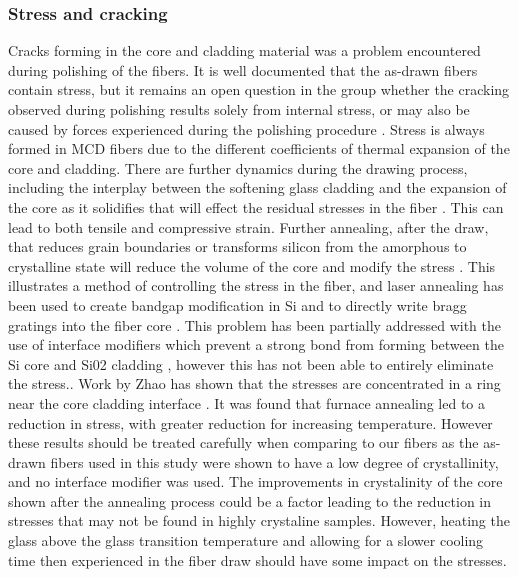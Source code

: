 \subsubsection{Stress and cracking}

Cracks forming in the core and cladding material was a problem encountered during polishing of the fibers. It is well documented that the as-drawn fibers contain stress, but it remains an open question in the group whether the cracking observed during polishing results solely from internal stress, or may also be caused by forces experienced during the polishing procedure \cite{Healy2018AFibres, Fokine2017LaserFibers, LapointeElectricalFibres, KristinKristin_thesis_final}. 
Stress is always formed in MCD fibers due to the different coefficients of thermal expansion of the core and cladding. There are further dynamics during the drawing process, including the interplay between the softening glass cladding and the expansion of the core as it solidifies that will effect the residual stresses in the fiber \cite{Healy2018AFibres}. This can lead to both tensile and compressive strain. Further annealing, after the draw, that reduces grain boundaries or transforms silicon from the amorphous to crystalline state will reduce the volume of the core and modify the stress \cite{Zhao2017EffectFibre}. This illustrates a method of controlling the stress in the fiber, and laser annealing has been used to create bandgap modification in Si \cite{Healy2014ExtremeFibres} and to directly write bragg gratings into the fiber core \cite{Fokine2017LaserFibers}. This problem has been partially addressed with the use of interface modifiers which prevent a strong bond from forming between the Si core and Si02 cladding \cite{Gibson2013AlkalineFibers}, however this has not been able to entirely eliminate the stress.. 
 Work by Zhao has shown that the stresses are concentrated in a ring near the core cladding interface \cite{Zhao2018EffectsFiber}. It was found that furnace annealing led to a reduction in stress, with greater reduction for increasing temperature. However these results should be treated carefully when comparing to our fibers as the as-drawn fibers used in this study were shown to have a low degree of crystallinity, and no interface modifier was used. The improvements in crystalinity of the core shown after the annealing process could be a factor leading to the reduction in stresses that may not be found in highly crystaline samples. However, heating the glass above the glass transition temperature and allowing for a slower cooling time then experienced in the fiber draw should have some impact on the stresses.

